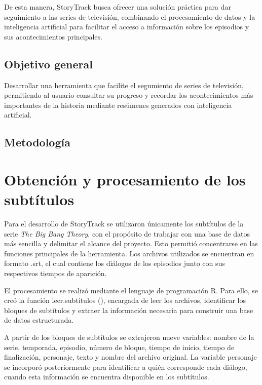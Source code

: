 \documentclass[
  spanish,
  12pt,
  letterpaper,
]{article}
\begin{document}
De esta manera, StoryTrack busca ofrecer una solución práctica para dar
seguimiento a las series de televisión, combinando el procesamiento de
datos y la inteligencia artificial para facilitar el acceso a
información sobre los episodios y sus acontecimientos principales.

\subsection{Objetivo general}\label{objetivo-general}

Desarrollar una herramienta que facilite el segumiento de series de
televisión, permitiendo al usuario consultar su progreso y recordar los
acontecimientos más importantes de la historia mediante resúmenes
generados con inteligencia artificial.

\subsection{Metodología}\label{metodologuxeda}

\section{Obtención y procesamiento de los
subtítulos}\label{obtenciuxf3n-y-procesamiento-de-los-subtuxedtulos}

Para el desarrollo de StoryTrack se utilizaron únicamente los subtítulos
de la serie \emph{The Big Bang Theory}, con el propósito de trabajar con
una base de datos más sencilla y delimitar el alcance del proyecto. Esto
permitió concentrarse en las funciones principales de la herramienta.
Los archivos utilizados se encuentran en formato .srt, el cual contiene
los diálogos de los episodios junto con sus respectivos tiempos de
aparición.

El procesamiento se realizó mediante el lenguaje de programación R. Para
ello, se creó la función leer.subtitulos (), encargada de leer los
archivos, identificar los bloques de subtítulos y extraer la información
necesaria para construir una base de datos estructurada.

A partir de los bloques de subtítulos se extrajeron nueve variables:
nombre de la serie, temporada, episodio, número de bloque, tiempo de
inicio, tiempo de finalización, personaje, texto y nombre del archivo
original. La variable personaje se incorporó posteriormente para
identificar a quién corresponde cada diálogo, cuando esta información se
encuentra disponible en los subtítulos.
\end{document}
